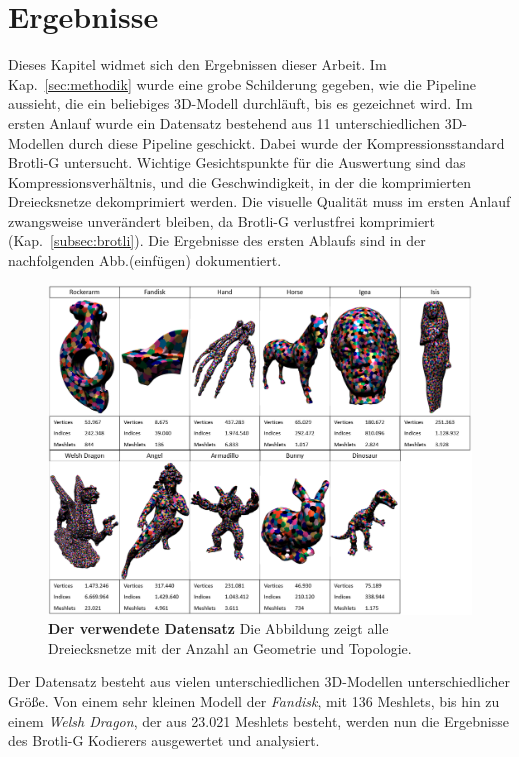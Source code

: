 \section{Ergebnisse}
\label{sec:ergebnisse}
Dieses Kapitel widmet sich den Ergebnissen dieser Arbeit. 
Im Kap.~\ref{sec:methodik} wurde eine grobe Schilderung gegeben, wie die Pipeline aussieht, die ein beliebiges 3D-Modell durchläuft, bis es gezeichnet wird.
Im ersten Anlauf wurde ein Datensatz bestehend aus 11 unterschiedlichen 3D-Modellen durch diese Pipeline geschickt. 
Dabei wurde der Kompressionsstandard Brotli-G untersucht. 
Wichtige Gesichtspunkte für die Auswertung sind das Kompressionsverhältnis, und die Geschwindigkeit, in der die komprimierten Dreiecksnetze dekomprimiert werden. 
Die visuelle Qualität muss im ersten Anlauf zwangsweise unverändert bleiben, da Brotli-G verlustfrei komprimiert (Kap.~\ref{subsec:brotli}). 
Die Ergebnisse des ersten Ablaufs sind in der nachfolgenden Abb.(einfügen) dokumentiert.

\begin{figure}[htb]
  \centering  
  \includegraphics[scale=0.5]{Bilder/Ergebnisse_zusammen.png}
  \caption[Der verwendete Datensatz]{\textbf{Der verwendete Datensatz} Die Abbildung zeigt alle Dreiecksnetze mit der Anzahl an Geometrie und Topologie. }
  \label{fig:mesh_shading_pipeline}
\end{figure}

Der Datensatz besteht aus vielen unterschiedlichen 3D-Modellen unterschiedlicher Größe. 
Von einem sehr kleinen Modell der \textit{Fandisk}, mit 136 Meshlets, bis hin zu einem \textit{Welsh Dragon}, der aus 23.021 Meshlets besteht, werden nun die Ergebnisse des Brotli-G Kodierers ausgewertet und analysiert.

